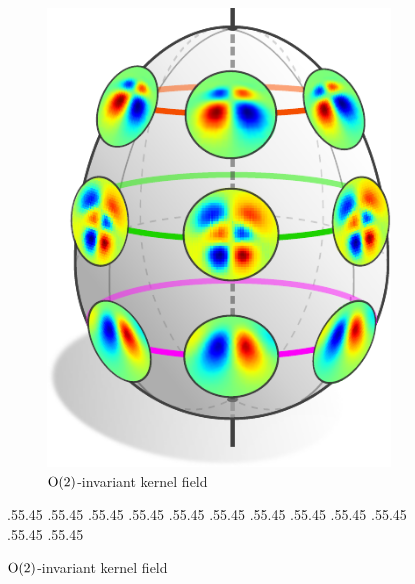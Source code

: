 \begin{figure}
\begin{subfigure}[b]{0.24\textwidth}
        \includegraphics[width=.92\textwidth]{figures/isometry_egg_intro_antisymmetric.pdf}
        \vspace*{-.5ex}
        \captionsetup{format=hang, width=.7\textwidth}
        \caption{\small
            $\operatorname{O}(2)$-invariant kernel field
        }
        \label{fig:isom_invariant_kernel_field_intro_O2}
    \end{subfigure}
    \par
    \vspace*{\dimexpr-\parskip-158.pt\relax}%
        .55\textwidth .45\textwidth %
        .55\textwidth .45\textwidth
        .55\textwidth .45\textwidth
        .55\textwidth .45\textwidth
        .55\textwidth .45\textwidth
        .55\textwidth .45\textwidth
        .55\textwidth .45\textwidth
        .55\textwidth .45\textwidth
        .55\textwidth .45\textwidth
        .55\textwidth .45\textwidth
        .55\textwidth .45\textwidth
        .55\textwidth .45\textwidth

\end{figure}
